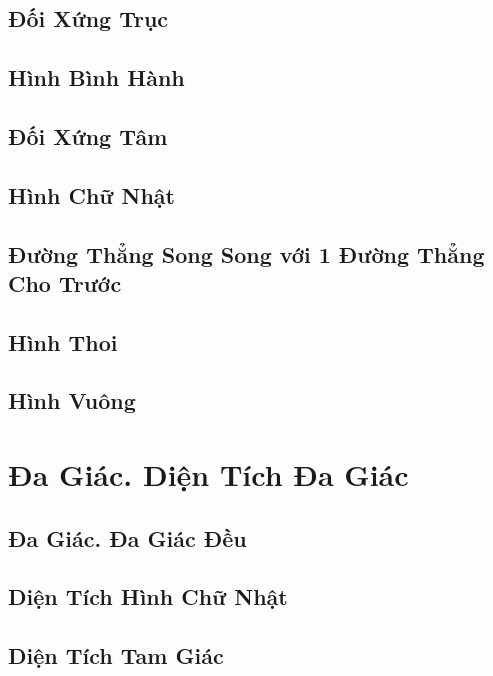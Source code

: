 \documentclass{article}
\numberwithin{equation}{section}
\begin{document}
\subsection{Đối Xứng Trục}

\subsection{Hình Bình Hành}

\subsection{Đối Xứng Tâm}

\subsection{Hình Chữ Nhật}

\subsection{Đường Thẳng Song Song với 1 Đường Thẳng Cho Trước}

\subsection{Hình Thoi}

\subsection{Hình Vuông}


\section{Đa Giác. Diện Tích Đa Giác}

\subsection{Đa Giác. Đa Giác Đều}

\subsection{Diện Tích Hình Chữ Nhật}

\subsection{Diện Tích Tam Giác}
\end{document}
